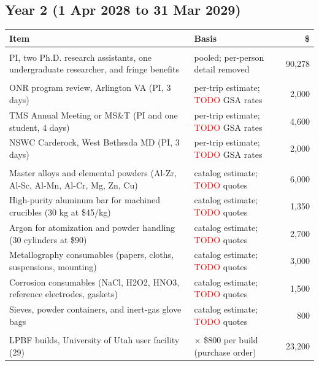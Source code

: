 \subsection*{Year 2 (1 Apr 2028 to 31 Mar 2029)}
\begin{longtable}{@{}>{\raggedright\arraybackslash}p{2.6in}>{\raggedright\arraybackslash}p{2.75in}r@{}}
\toprule \textbf{Item} & \textbf{Basis} & \textbf{\$} \\ \midrule \endhead
\multicolumn{3}{@{}l}{\textit{A--C. Personnel and fringe benefits (pooled)}} \\
PI, two Ph.D. research assistants, one undergraduate researcher, and fringe benefits & pooled; per-person detail removed & 90,278 \\
%
%
%
%
%
%
\multicolumn{3}{@{}l}{\textit{E. Travel}} \\
ONR program review, Arlington VA (PI, 3 days) & per-trip estimate; \textcolor{red}{TODO} GSA rates & 2,000 \\
TMS Annual Meeting or MS\&T (PI and one student, 4 days) & per-trip estimate; \textcolor{red}{TODO} GSA rates & 4,600 \\
NSWC Carderock, West Bethesda MD (PI, 3 days) & per-trip estimate; \textcolor{red}{TODO} GSA rates & 2,000 \\
\multicolumn{3}{@{}l}{\textit{F. Materials and supplies}} \\
Master alloys and elemental powders (Al-Zr, Al-Sc, Al-Mn, Al-Cr, Mg, Zn, Cu) & catalog estimate; \textcolor{red}{TODO} quotes & 6,000 \\
High-purity aluminum bar for machined crucibles (30 kg at \$45/kg) & catalog estimate; \textcolor{red}{TODO} quotes & 1,350 \\
Argon for atomization and powder handling (30 cylinders at \$90) & catalog estimate; \textcolor{red}{TODO} quotes & 2,700 \\
Metallography consumables (papers, cloths, suspensions, mounting) & catalog estimate; \textcolor{red}{TODO} quotes & 3,000 \\
Corrosion consumables (NaCl, H2O2, HNO3, reference electrodes, gaskets) & catalog estimate; \textcolor{red}{TODO} quotes & 1,500 \\
Sieves, powder containers, and inert-gas glove bags & catalog estimate; \textcolor{red}{TODO} quotes & 800 \\
\multicolumn{3}{@{}l}{\textit{G. Other direct costs}} \\
LPBF builds, University of Utah user facility (29) & 29 $\times$ \$800 per build (purchase order) & 23,200 \\

\end{longtable}
